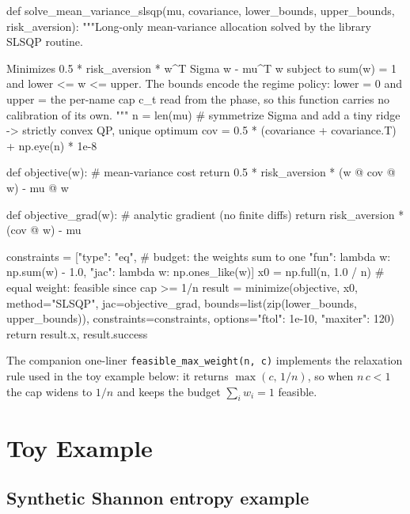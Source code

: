 \documentclass[a4paper,12pt]{article}
\begin{document}
\begin{code}[caption={Daily long-only mean-variance allocation via library SLSQP},label={lst:slsqp}]
def solve_mean_variance_slsqp(mu, covariance, lower_bounds, upper_bounds,
                              risk_aversion):
    """Long-only mean-variance allocation solved by the library SLSQP routine.

    Minimizes  0.5 * risk_aversion * w^T Sigma w  -  mu^T w
    subject to sum(w) = 1 and lower <= w <= upper. The bounds encode the
    regime policy: lower = 0 and upper = the per-name cap c_t read from the
    phase, so this function carries no calibration of its own.
    """
    n = len(mu)
    # symmetrize Sigma and add a tiny ridge -> strictly convex QP, unique optimum
    cov = 0.5 * (covariance + covariance.T) + np.eye(n) * 1e-8

    def objective(w):                       # mean-variance cost
        return 0.5 * risk_aversion * (w @ cov @ w) - mu @ w

    def objective_grad(w):                  # analytic gradient (no finite diffs)
        return risk_aversion * (cov @ w) - mu

    constraints = [{"type": "eq",           # budget: the weights sum to one
                    "fun": lambda w: np.sum(w) - 1.0,
                    "jac": lambda w: np.ones_like(w)}]
    x0 = np.full(n, 1.0 / n)                 # equal weight: feasible since cap >= 1/n
    result = minimize(objective, x0,
                      method="SLSQP", jac=objective_grad,
                      bounds=list(zip(lower_bounds, upper_bounds)),
                      constraints=constraints,
                      options={"ftol": 1e-10, "maxiter": 120})
    return result.x, result.success
\end{code}

The companion one-liner \texttt{feasible\_max\_weight(n, c)} implements the relaxation rule used in the toy example below: it returns $\max(c,\,1/n)$, so when $n\,c<1$ the cap widens to $1/n$ and keeps the budget $\sum_i w_i=1$ feasible.

\section{Toy Example}
\label{sec:toy}

\subsection{Synthetic Shannon entropy example}
\end{document}
